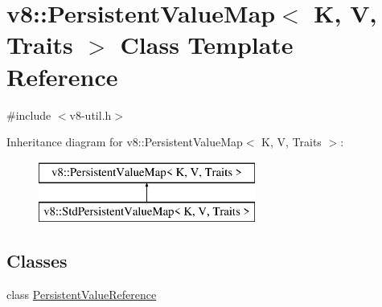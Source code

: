 \hypertarget{classv8_1_1_persistent_value_map}{}\section{v8\+:\+:Persistent\+Value\+Map$<$ K, V, Traits $>$ Class Template Reference}
\label{classv8_1_1_persistent_value_map}


{\ttfamily \#include $<$v8-\/util.\+h$>$}

Inheritance diagram for v8\+:\+:Persistent\+Value\+Map$<$ K, V, Traits $>$\+:\begin{figure}[H]
\begin{center}
\leavevmode
\includegraphics[height=2.000000cm]{classv8_1_1_persistent_value_map}
\end{center}
\end{figure}
\subsection*{Classes}
\begin{DoxyCompactItemize}
\item 
class \hyperlink{classv8_1_1_persistent_value_map_1_1_persistent_value_reference}{Persistent\+Value\+Reference}
\end{DoxyCompactItemize}
